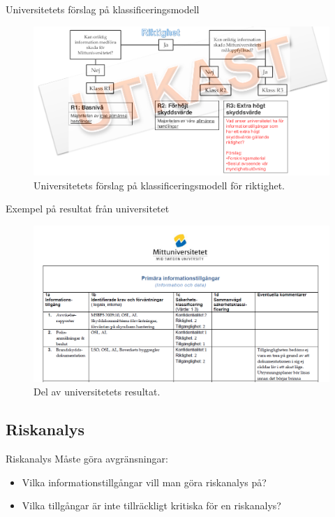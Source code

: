 \documentclass{beamer}
\begin{document}
\begin{frame}{Universitetets förslag på klassificeringsmodell}
  \begin{figure}
    \includegraphics[width=\textwidth]{miun-riktighet.png}
    \caption{Universitetets förslag på klassificeringsmodell för riktighet.}
  \end{figure}
\end{frame}

\begin{frame}{Exempel på resultat från universitetet}
  \begin{figure}
    \includegraphics[width=\textwidth]{miun-klassresultat.png}
    \caption{Del av universitetets resultat.}
  \end{figure}
\end{frame}

\subsection{Riskanalys}

\begin{frame}{Riskanalys}
  Måste göra avgränsningar:
  \begin{itemize}
    \item Vilka informationstillgångar vill man göra riskanalys på?
    \item Vilka tillgångar är inte tillräckligt kritiska för en riskanalys?
  \end{itemize}
\end{frame}
\end{document}

